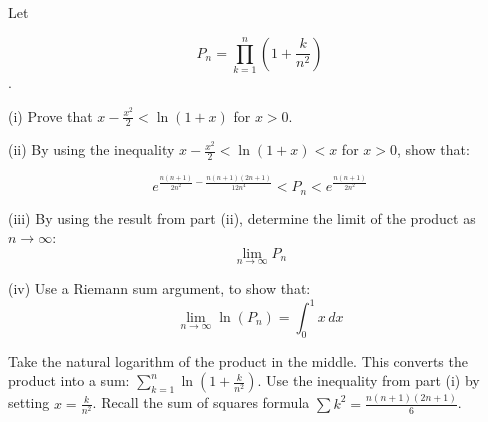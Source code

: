 \begin{problem}

Let 

\[ P_n = \prod_{k=1}^n \left( 1 + \frac{k}{n^2} \right) \].

(i) Prove that $x - \frac{x^2}{2} < \ln(1+x)$ for $x > 0$.

(ii) By using the inequality $x - \frac{x^2}{2} < \ln(1+x) < x$ for $x>0$, show that:

\[ e^{\frac{n(n+1)}{2n^2} - \frac{n(n+1)(2n+1)}{12n^4}} < P_n < e^{\frac{n(n+1)}{2n^2}} \]

(iii) By using the result from part (ii), determine the limit of the product as $n \to \infty$:
\[
\lim_{n \to \infty} P_n
\]

(iv) Use a Riemann sum argument, to show that:
\[
\lim_{n \to \infty} \ln \left(P_n\right) = \int_{0}^{1} x \, dx
\]

\end{problem}

\begin{hint}
Take the natural logarithm of the product in the middle. This converts the product into a sum: $\sum_{k=1}^n \ln(1 + \frac{k}{n^2})$.
Use the inequality from part (i) by setting $x = \frac{k}{n^2}$.
Recall the sum of squares formula $\sum k^2 = \frac{n(n+1)(2n+1)}{6}$.
\end{hint}

